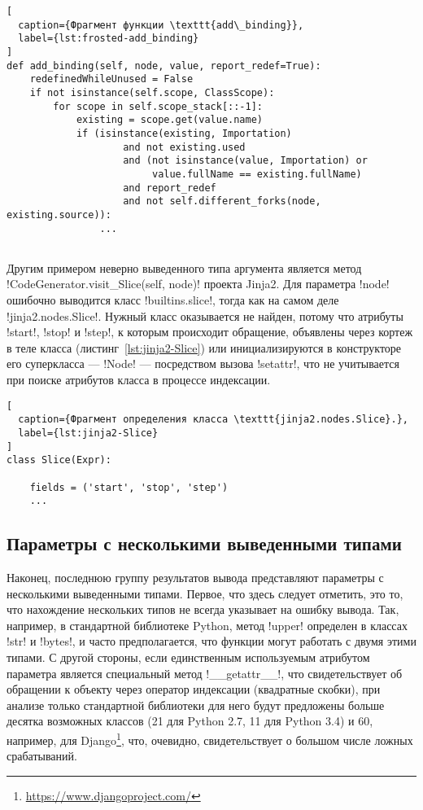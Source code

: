\begin{lstlisting}[
  caption={Фрагмент функции \texttt{add\_binding}},
  label={lst:frosted-add_binding}
]
def add_binding(self, node, value, report_redef=True):
    redefinedWhileUnused = False
    if not isinstance(self.scope, ClassScope):
        for scope in self.scope_stack[::-1]:
            existing = scope.get(value.name)
            if (isinstance(existing, Importation)
                    and not existing.used
                    and (not isinstance(value, Importation) or
                         value.fullName == existing.fullName)
                    and report_redef
                    and not self.different_forks(node, existing.source)):
                ...
    
\end{lstlisting}

Другим примером неверно выведенного типа аргумента является метод
!CodeGenerator.visit_Slice(self, node)! проекта Jinja2. Для параметра !node!
ошибочно выводится класс !builtins.slice!, тогда как на самом деле
!jinja2.nodes.Slice!. Нужный класс оказывается не найден, потому что атрибуты
!start!, !stop! и !step!, к которым происходит обращение, объявлены через кортеж
в теле класса (листинг~\ref{lst:jinja2-Slice}) или инициализируются в
конструкторе его суперкласса --- !Node! --- посредством вызова !setattr!, что не
учитывается при поиске атрибутов класса в процессе индексации.

\begin{lstlisting}[
  caption={Фрагмент определения класса \texttt{jinja2.nodes.Slice}.},
  label={lst:jinja2-Slice}
]
class Slice(Expr):

    fields = ('start', 'stop', 'step')
    ...

\end{lstlisting}

\subsection{Параметры с несколькими выведенными типами}
\label{sub:scattered-type-parameters}

Наконец, последнюю группу результатов вывода представляют параметры с
несколькими выведенными типами. Первое, что здесь следует отметить, это то, что
нахождение нескольких типов не всегда указывает на ошибку вывода. Так, например,
в стандартной библиотеке Python, метод !upper! определен в классах !str! и
!bytes!, и часто предполагается, что функции могут работать с двумя этими
типами. С другой стороны, если единственным используемым атрибутом параметра
является специальный метод !__getattr__!, что свидетельствует об обращении к
объекту через оператор индексации (квадратные скобки), при анализе только
стандартной библиотеки для него будут предложены больше десятка возможных
классов (21 для Python 2.7, 11 для Python 3.4) и 60, например, для
Django\footnote{\url{https://www.djangoproject.com/}}, что, очевидно,
свидетельствует о большом числе ложных срабатываний. 


